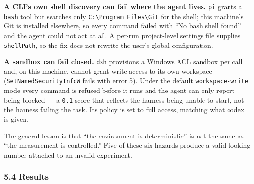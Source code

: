 \documentclass[
]{article}
\begin{document}
\textbf{A CLI's own shell discovery can fail where the agent lives.}
\texttt{pi} grants a \texttt{bash} tool but searches only
\texttt{C:\textbackslash{}Program\ Files\textbackslash{}Git} for the
shell; this machine's Git is installed elsewhere, so every command
failed with ``No bash shell found'' and the agent could not act at all.
A per-run project-level settings file supplies \texttt{shellPath}, so
the fix does not rewrite the user's global configuration.

\textbf{A sandbox can fail closed.} \texttt{dsh} provisions a Windows
ACL sandbox per call and, on this machine, cannot grant write access to
its own workspace (\texttt{SetNamedSecurityInfoW} fails with error 5).
Under the default \texttt{workspace-write} mode every command is refused
before it runs and the agent can only report being blocked --- a
\texttt{0.1} score that reflects the harness being unable to start, not
the harness failing the task. Its policy is set to full access, matching
what codex is given.

The general lesson is that ``the environment is deterministic'' is not
the same as ``the measurement is controlled.'' Five of these six hazards
produce a valid-looking number attached to an invalid experiment.

\subsubsection{5.4 Results}\label{results-1}
\end{document}
